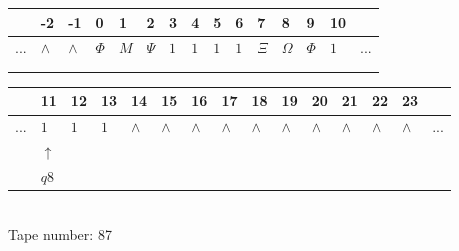 \documentclass[11pt]{article}
\begin{document}
\begin{table}[H]
\centering
\begin{tabular}{lllllllllllllll}
 & -2 & -1 & 0 & 1 & 2 & 3 & 4 & 5 & 6 & 7 & 8 & 9 & 10 & \\
\hline
$...$ & \multicolumn{1}{|l|}{$\wedge$} & \multicolumn{1}{|l|}{$\wedge$} & \multicolumn{1}{|l|}{$\Phi$} & \multicolumn{1}{|l|}{$M$} & \multicolumn{1}{|l|}{$\Psi$} & \multicolumn{1}{|l|}{$1$} & \multicolumn{1}{|l|}{$1$} & \multicolumn{1}{|l|}{$1$} & \multicolumn{1}{|l|}{$1$} & \multicolumn{1}{|l|}{$\Xi$} & \multicolumn{1}{|l|}{$\Omega$} & \multicolumn{1}{|l|}{$\Phi$} & \multicolumn{1}{|l|}{$1$} & $...$\\
\hline
&  &  &  &  &  &  &  &  &  &  &  &  &  &  \\
&  &  &  &  &  &  &  &  &  &  &  &  &  &  \\
\end{tabular}
\begin{tabular}{lllllllllllllll}
 & 11 & 12 & 13 & 14 & 15 & 16 & 17 & 18 & 19 & 20 & 21 & 22 & 23 & \\
\hline
$...$ & \multicolumn{1}{|l|}{$1$} & \multicolumn{1}{|l|}{$1$} & \multicolumn{1}{|l|}{$1$} & \multicolumn{1}{|l|}{$\wedge$} & \multicolumn{1}{|l|}{$\wedge$} & \multicolumn{1}{|l|}{$\wedge$} & \multicolumn{1}{|l|}{$\wedge$} & \multicolumn{1}{|l|}{$\wedge$} & \multicolumn{1}{|l|}{$\wedge$} & \multicolumn{1}{|l|}{$\wedge$} & \multicolumn{1}{|l|}{$\wedge$} & \multicolumn{1}{|l|}{$\wedge$} & \multicolumn{1}{|l|}{$\wedge$} & $...$\\
\hline
& $\uparrow$ &  &  &  &  &  &  &  &  &  &  &  &  &  \\
& $ q8 $ &  &  &  &  &  &  &  &  &  &  &  &  &  \\
\end{tabular}
\\
Tape number: 87
\noindent\makebox[\linewidth]{\hdashrule{\textwidth}{1pt}{1pt}}\end{table}
\clearpage
\end{document}
